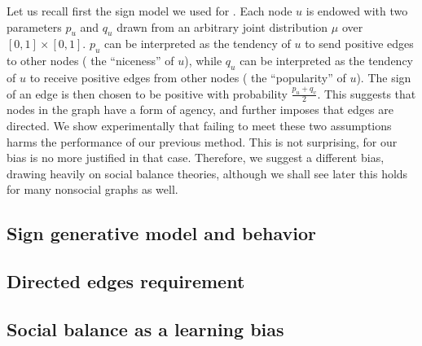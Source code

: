 Let us recall first the sign model we used for \dssn{}. Each node $u$ is endowed with two parameters
$p_u$ and $q_u$ drawn from an arbitrary joint distribution $\mu$ over $[0,1]\times [0,1]$. $p_u$ can be
interpreted as the tendency of $u$ to send positive edges to other nodes (\ie{} the
\enquote{niceness} of $u$), while $q_u$ can be interpreted as the tendency of $u$ to receive positive
edges from other nodes (\ie{} the \enquote{popularity} of $u$). The sign of an edge \euv{} is then
chosen to be positive with probability $\frac{p_u+q_v}{2}$. This suggests that nodes in the
graph have a form of agency, and further imposes that edges are directed. We show experimentally that
failing to meet these two assumptions harms the performance of our previous method. This is not
surprising, for our bias is no more justified in that case. Therefore, we suggest a different bias,
drawing heavily on social balance theories, although we shall see later this holds for many
nonsocial graphs as well.

\subsection{Sign generative model and behavior}
\label{sub:bias_sign_behavior}



\subsection{Directed edges requirement}
\label{sub:need_for_a_directed_graph}



\subsection{Social balance as a learning bias}
\label{sub:bias_balance}


